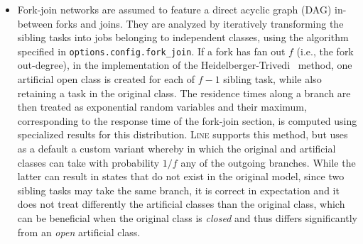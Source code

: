\begin{itemize}
    \item Fork-join networks are assumed to feature a direct acyclic graph (DAG) in-between forks and joins. They are analyzed by iteratively transforming the sibling tasks into jobs belonging to independent classes, using the algorithm specified in \texttt{options.config.fork\_join}. If a fork has fan out $f$ (i.e., the fork out-degree), in the implementation of the Heidelberger-Trivedi~\cite{heidelberger1982queueing} method, one artificial open class is created for each of $f-1$ sibling task, while also retaining a task in the original class. The residence times along a branch are then treated as exponential random variables and their maximum, corresponding to the response time of the fork-join section, is computed using specialized results for this distribution. \textsc{Line} supports this method, but uses as a default a custom variant whereby in which the original and artificial classes can take with probability $1/f$ any of the outgoing branches. While the latter can result in states that do not exist in the original model, since two sibling tasks may take the same branch, it is correct in expectation and it does not treat differently the artificial classes than the original class, which can be beneficial when the original class is \textit{closed} and thus differs significantly from an \textit{open} artificial class.
\end{itemize}



